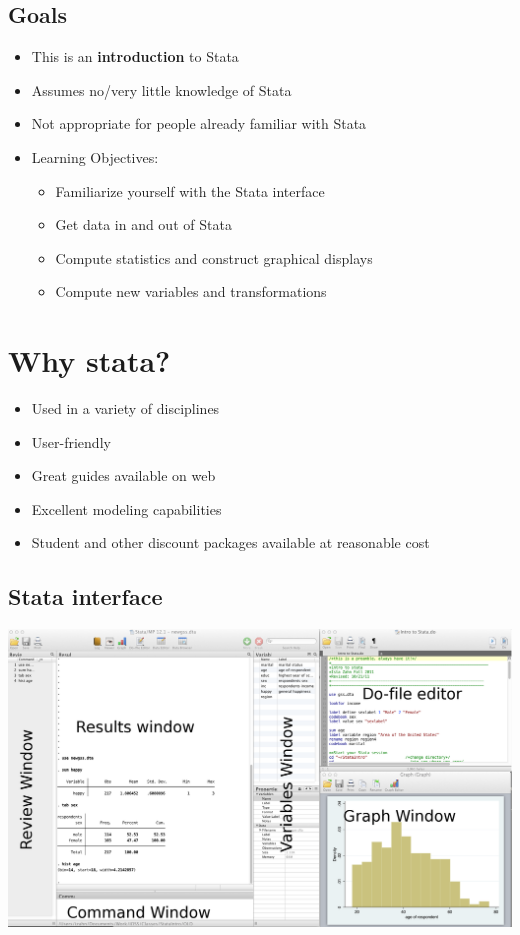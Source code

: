 \documentclass[
]{book}
\providecommand{\tightlist}{%
  \setlength{\itemsep}{0pt}\setlength{\parskip}{0pt}}
\begin{document}
\hypertarget{goals-3}{%
\subsection{Goals}\label{goals-3}}

\begin{itemize}
\tightlist
\item
  This is an \textbf{introduction} to Stata
\item
  Assumes no/very little knowledge of Stata
\item
  Not appropriate for people already familiar with Stata
\item
  Learning Objectives:

  \begin{itemize}
  \tightlist
  \item
    Familiarize yourself with the Stata interface
  \item
    Get data in and out of Stata
  \item
    Compute statistics and construct graphical displays
  \item
    Compute new variables and transformations
  \end{itemize}
\end{itemize}

\hypertarget{why-stata}{%
\section{Why stata?}\label{why-stata}}

\begin{itemize}
\tightlist
\item
  Used in a variety of disciplines
\item
  User-friendly
\item
  Great guides available on web
\item
  Excellent modeling capabilities
\item
  Student and other discount packages available at reasonable cost
\end{itemize}

\hypertarget{stata-interface}{%
\subsection{Stata interface}\label{stata-interface}}

\includegraphics{Stata/StataIntro/images/StataInterface.png}
\end{document}
